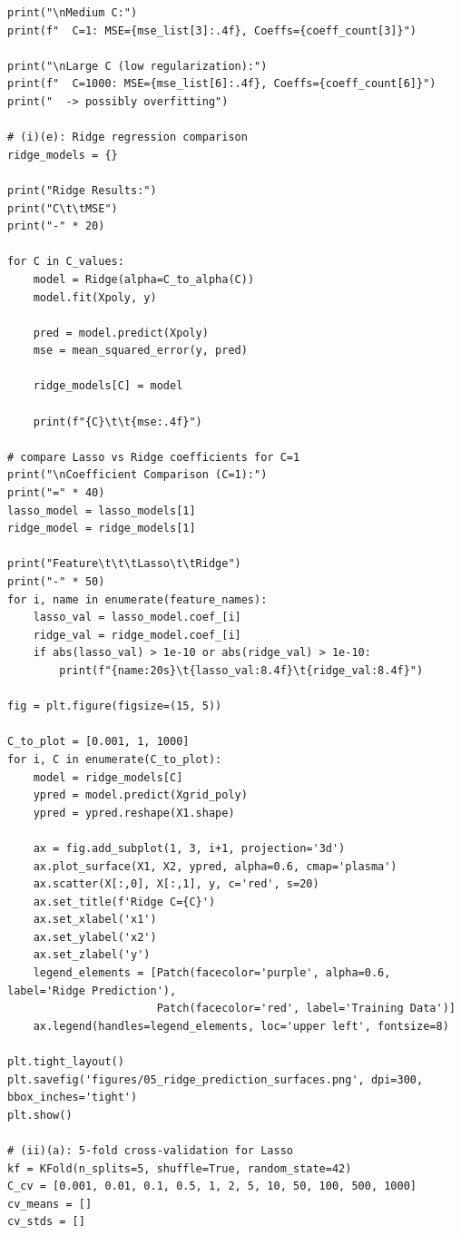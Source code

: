 \documentclass[11pt,a4paper]{article}
\begin{document}
\begin{lstlisting}
print("\nMedium C:")
print(f"  C=1: MSE={mse_list[3]:.4f}, Coeffs={coeff_count[3]}")

print("\nLarge C (low regularization):")
print(f"  C=1000: MSE={mse_list[6]:.4f}, Coeffs={coeff_count[6]}")
print("  -> possibly overfitting")

# (i)(e): Ridge regression comparison
ridge_models = {}

print("Ridge Results:")
print("C\t\tMSE")
print("-" * 20)

for C in C_values:
    model = Ridge(alpha=C_to_alpha(C))
    model.fit(Xpoly, y)
    
    pred = model.predict(Xpoly)
    mse = mean_squared_error(y, pred)
    
    ridge_models[C] = model
    
    print(f"{C}\t\t{mse:.4f}")

# compare Lasso vs Ridge coefficients for C=1
print("\nCoefficient Comparison (C=1):")
print("=" * 40)
lasso_model = lasso_models[1]
ridge_model = ridge_models[1]

print("Feature\t\t\tLasso\t\tRidge")
print("-" * 50)
for i, name in enumerate(feature_names):
    lasso_val = lasso_model.coef_[i]
    ridge_val = ridge_model.coef_[i]
    if abs(lasso_val) > 1e-10 or abs(ridge_val) > 1e-10:
        print(f"{name:20s}\t{lasso_val:8.4f}\t{ridge_val:8.4f}")

fig = plt.figure(figsize=(15, 5))

C_to_plot = [0.001, 1, 1000]
for i, C in enumerate(C_to_plot):
    model = ridge_models[C]
    ypred = model.predict(Xgrid_poly)
    ypred = ypred.reshape(X1.shape)
    
    ax = fig.add_subplot(1, 3, i+1, projection='3d')
    ax.plot_surface(X1, X2, ypred, alpha=0.6, cmap='plasma')
    ax.scatter(X[:,0], X[:,1], y, c='red', s=20)
    ax.set_title(f'Ridge C={C}')
    ax.set_xlabel('x1')
    ax.set_ylabel('x2')
    ax.set_zlabel('y')
    legend_elements = [Patch(facecolor='purple', alpha=0.6, label='Ridge Prediction'),
                       Patch(facecolor='red', label='Training Data')]
    ax.legend(handles=legend_elements, loc='upper left', fontsize=8)

plt.tight_layout()
plt.savefig('figures/05_ridge_prediction_surfaces.png', dpi=300, bbox_inches='tight')
plt.show()

# (ii)(a): 5-fold cross-validation for Lasso
kf = KFold(n_splits=5, shuffle=True, random_state=42)
C_cv = [0.001, 0.01, 0.1, 0.5, 1, 2, 5, 10, 50, 100, 500, 1000]
cv_means = []
cv_stds = []


\end{lstlisting}
\end{document}
